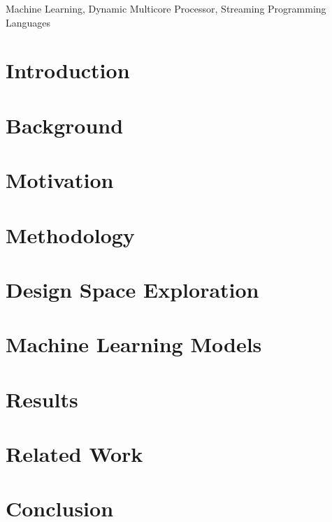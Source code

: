 \documentclass[copyrightspace,9pt]{sigplanconf}
\begin{document}
\keywords
Machine Learning, Dynamic Multicore Processor, Streaming Programming Languages

\section{Introduction}
\label{sec:intro}


\section{Background}
\label{sec:background}


\section{Motivation}
\label{sec:motiviation}


\section{Methodology}
\label{sec:setup}


\section{Design Space Exploration}
\label{sec:dse}


\section{Machine Learning Models}
\label{sec:ml}



%

\section{Results}
\label{sec:results}


\section{Related Work}
\label{sec:related}


\section{Conclusion}
\label{sec:conclusion}

\end{document}

